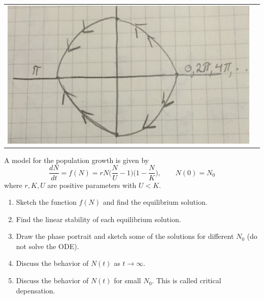 \documentclass[12pt]{article}
\newenvironment{exercise}[2][Exercise]{\begin{trivlist}
\item[\hskip \labelsep {\bfseries #1}\hskip \labelsep {\bfseries #2.}]}{\end{trivlist}}
\begin{document}
\begin{exercise}{2}
\begin{enumerate}
\begin{tabular}{ll}
	\includegraphics[scale=.07]{phaseportrait2b}
	\end{tabular}
\end{enumerate}	
\end{exercise}

\begin{exercise}{3}
A model for the population growth is given by 
$$\frac{dN}{dt} = f(N) = rN \bigg( \frac{N}{U} - 1 \bigg)\bigg( 1 - \frac{N}{K} \bigg), \qquad N(0) = N_0$$
where $r, K, U$ are positive parameters with $U < K$.

\begin{enumerate}
\item[a)] Sketch the function $f(N)$ and find the equilibrium solution.
\item[b)] Find the linear stability of each equilibrium solution.
\item[c)] Draw the phase portrait and sketch some of the solutions for different $N_0$ (do not solve the ODE).
\item[d)] Discuss the behavior of $N(t)$ as $t \rightarrow \infty$.
\item[e)] Discuss the behavior of $N(t)$ for small $N_0$. This is called critical depensation.
\end{enumerate}
\end{exercise}

 
\end{document}
